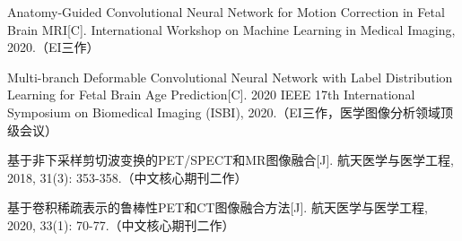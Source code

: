 \noindent [12] Anatomy-Guided Convolutional Neural Network for Motion Correction in Fetal Brain MRI[C]. International Workshop on Machine Learning in Medical Imaging, 2020.（EI三作）

\noindent [13] Multi-branch Deformable Convolutional Neural Network with Label Distribution Learning for Fetal Brain Age Prediction[C]. 2020 IEEE 17th International Symposium on Biomedical Imaging (ISBI), 2020.（EI三作，医学图像分析领域顶级会议）

\noindent [14] 基于非下采样剪切波变换的PET/SPECT和MR图像融合[J]. 航天医学与医学工程, 2018, 31(3): 353-358.（中文核心期刊二作）

\noindent [15] 基于卷积稀疏表示的鲁棒性PET和CT图像融合方法[J]. 航天医学与医学工程, 2020, 33(1): 70-77.（中文核心期刊二作）